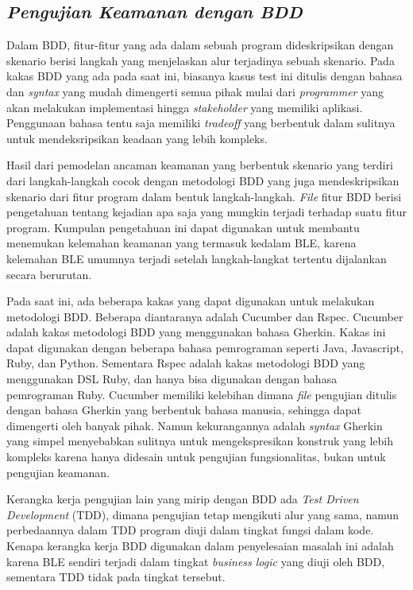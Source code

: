 \subsection{\textit{Pengujian Keamanan dengan BDD}}

Dalam BDD, fitur-fitur yang ada dalam sebuah program dideskripsikan dengan skenario
berisi langkah yang menjelaskan alur terjadinya sebuah skenario. Pada kakas BDD
yang ada pada saat ini, biasanya kasus test ini ditulis dengan bahasa dan \emph{syntax}
yang mudah dimengerti semua pihak mulai dari \emph{programmer} yang akan melakukan implementasi
hingga \emph{stakeholder} yang memiliki aplikasi. Penggunaan bahasa tentu saja memiliki \emph{tradeoff}
yang berbentuk dalam sulitnya untuk mendeksripsikan keadaan yang lebih kompleks.

Hasil dari pemodelan ancaman keamanan yang berbentuk skenario yang terdiri dari langkah-langkah
cocok dengan metodologi BDD yang juga mendeskripsikan skenario dari fitur program dalam bentuk
langkah-langkah. \emph{File} fitur BDD berisi pengetahuan tentang kejadian apa saja yang mungkin
terjadi terhadap suatu fitur program. Kumpulan pengetahuan ini dapat digunakan untuk
membantu menemukan kelemahan keamanan yang termasuk kedalam BLE, karena kelemahan BLE
umumnya terjadi setelah langkah-langkat tertentu dijalankan secara berurutan.

Pada saat ini, ada beberapa kakas yang dapat digunakan untuk melakukan metodologi BDD.
Beberapa diantaranya adalah Cucumber dan Rspec.
Cucumber adalah kakas metodologi BDD yang menggunakan bahasa Gherkin. Kakas ini dapat
digunakan dengan beberapa bahasa pemrograman seperti Java, Javascript, Ruby, dan Python.
Sementara Rspec adalah kakas metodologi BDD yang menggunakan DSL Ruby, dan hanya bisa
digunakan dengan bahasa pemrograman Ruby.
Cucumber memiliki kelebihan dimana \emph{file} pengujian ditulis dengan bahasa Gherkin
yang berbentuk bahasa manusia, sehingga dapat dimengerti oleh banyak pihak. Namun kekurangannya
adalah \emph{syntax} Gherkin yang simpel menyebabkan sulitnya untuk mengekspresikan konstruk
yang lebih kompleks karena hanya didesain untuk pengujian fungsionalitas, bukan untuk
pengujian keamanan.

Kerangka kerja pengujian lain yang mirip dengan BDD ada \textit{Test Driven Development} (TDD),
dimana pengujian tetap mengikuti alur yang sama, namun perbedaannya dalam TDD program diuji dalam
tingkat fungsi dalam kode. Kenapa kerangka kerja BDD digunakan dalam penyelesaian masalah ini adalah
karena BLE sendiri terjadi dalam tingkat \textit{business logic} yang diuji oleh BDD, sementara TDD
tidak pada tingkat tersebut.


